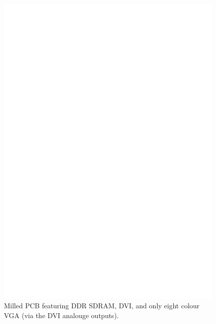 \begin{figure}
\begin{center}
\includegraphics[width=\linewidth]{images/FreeGA_orig.eps}
\caption[OpenVGA V2 with DDR SDRAM]{Milled PCB featuring DDR SDRAM, DVI, and
only eight colour VGA (via the DVI analouge outputs).}
\label{HARD_FreeGA_DDR}
\end{center}
\end{figure}


